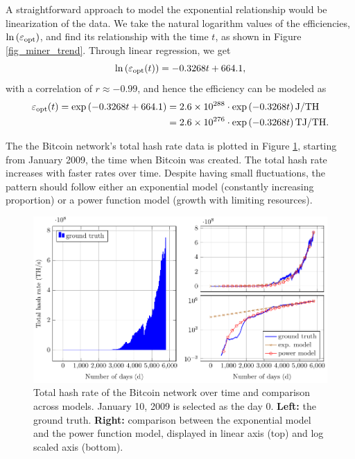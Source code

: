 \documentclass[12pt]{article}
\begin{document}
A straightforward approach to model the exponential relationship would be linearization of the data. We take the natural logarithm values of the efficiencies, $\ln\left(\varepsilon_{\rm opt}\right)$, and find its relationship with the time $t$, as shown in Figure \ref{fig_miner_trend}. Through linear regression, we get
\begin{equation}
	\ln\left(\varepsilon_{\rm opt} (t)\right) = -0.3268t + 664.1,
\end{equation}
with a correlation of $r \approx -0.99$, and hence the efficiency can be modeled as
\begin{align}
	\varepsilon_{\rm opt} (t) = \exp \left(-0.3268t + 664.1\right)
	&= 2.6 \times 10^{288} \cdot \exp \left(-0.3268t\right) {\rm J/TH} \\
	&= 2.6 \times 10^{276} \cdot \exp \left(-0.3268t\right) {\rm TJ/TH}.
	\label{eq_efficiency}
\end{align}

The the Bitcoin network's total hash rate data \citep{hashrate} is plotted in Figure \ref{fig_total_hashrate}, starting from January 2009, the time when Bitcoin was created. The total hash rate increases with faster rates over time. Despite having small fluctuations, the pattern should follow either an exponential model (constantly increasing proportion) or a power function model (growth with limiting resources).

\begin{figure}[!t]
	\centering
	\caption{Total hash rate of the Bitcoin network over time and comparison across models. January 10, 2009 is selected as the day 0. \textbf{Left:} the ground truth. \textbf{Right:} comparison between the exponential model and the power function model, displayed in linear axis (top) and log scaled axis (bottom).}
	\label{fig_total_hashrate}
	\medskip
	\includegraphics{figures/trends/bitcoin_hashrate.pdf}
\end{figure}
\end{document}

